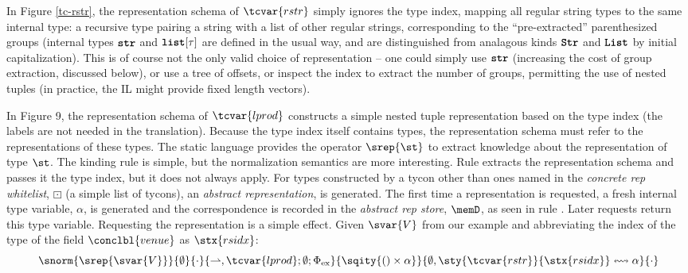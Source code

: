 In Figure \ref{tc-rstr}, the representation schema of $\tcvar{rstr}$ simply ignores the type index, mapping all regular string types to the same internal type: a recursive type pairing a string  with a list of other regular strings, corresponding to the ``pre-extracted'' parenthesized groups (internal types $\texttt{\textbf{str}}$ and $\texttt{\textbf{list}}[\tau]$ are defined in the usual way, and are distinguished from analagous kinds $\texttt{\textbf{Str}}$ and $\texttt{\textbf{List}}$ by initial capitalization). This is of course not the only valid choice of representation -- one could simply use $\texttt{\textbf{str}}$ (increasing the cost of group extraction, discussed below), or use a tree of offsets, or inspect the index to extract the number of groups, permitting the use of nested tuples (in practice, the IL might provide fixed length vectors). %

In Figure 9, the representation schema of $\tcvar{lprod}$ constructs a simple nested tuple representation based on the type index (the labels are not needed in the translation). Because the type index itself contains types, the representation schema must refer to the representations of these types. The static language provides the operator $\srep{\st}$ to extract knowledge about the representation of type $\st$. The kinding rule  is simple, but the normalization semantics are more interesting. Rule   extracts the representation schema and  passes it the type index, but it does not always apply. For types constructed by a tycon other than ones named in the \emph{concrete rep whitelist}, $\boxdot$ (a simple list of tycons), an \emph{abstract representation}, is generated. The first time a representation is requested, a fresh internal type variable, $\alpha$, is generated and the correspondence is recorded in the \emph{abstract rep store}, $\memD$, as seen in rule . Later requests return this type variable. Requesting the representation is a simple effect. Given $\svar{V}$ from our example and abbreviating the index of the type of the field $\conclbl{venue}$ as $\stx{rsidx}$: \[\snorm{\srep{\normalsize\svar{V}\scriptsize}}{\emptyset}{\cdot}{{\rightharpoonup},\tcvar{lprod}; \emptyset; \Phi_\text{ex}}{\sqity{\iunit\times\alpha}}{\emptyset, \sty{\tcvar{rstr}}{\stx{rsidx}} \leftrightsquigarrow \alpha}{\cdot}\]

